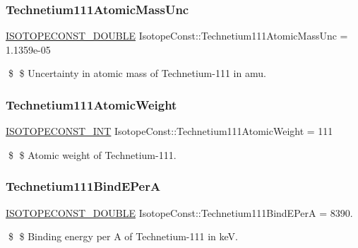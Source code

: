 \subsubsection{\texorpdfstring{Technetium111\+Atomic\+Mass\+Unc}{Technetium111AtomicMassUnc}}
{\footnotesize\ttfamily \mbox{\hyperlink{group___isotope_const-_macros_ga8f45a7272ce02c0b4c65c44636ed719a}{I\+S\+O\+T\+O\+P\+E\+C\+O\+N\+S\+T\+\_\+\+D\+O\+U\+B\+LE}} Isotope\+Const\+::\+Technetium111\+Atomic\+Mass\+Unc = 1.\+1359e-\/05}

\$ \$ Uncertainty in atomic mass of Technetium-\/111 in amu. \mbox{\label{group___isotope_const-_technetium-_tc111_gadb44932c0d6378e364ed1a945be941c7}} 
\subsubsection{\texorpdfstring{Technetium111\+Atomic\+Weight}{Technetium111AtomicWeight}}
{\footnotesize\ttfamily \mbox{\hyperlink{group___isotope_const-_macros_ga5f18360b3e99483a35c32d789e62621c}{I\+S\+O\+T\+O\+P\+E\+C\+O\+N\+S\+T\+\_\+\+I\+NT}} Isotope\+Const\+::\+Technetium111\+Atomic\+Weight = 111}

\$ \$ Atomic weight of Technetium-\/111. \mbox{\label{group___isotope_const-_technetium-_tc111_ga9b9850327df562053d065672c5c4f3b2}} 
\subsubsection{\texorpdfstring{Technetium111\+Bind\+E\+PerA}{Technetium111BindEPerA}}
{\footnotesize\ttfamily \mbox{\hyperlink{group___isotope_const-_macros_ga8f45a7272ce02c0b4c65c44636ed719a}{I\+S\+O\+T\+O\+P\+E\+C\+O\+N\+S\+T\+\_\+\+D\+O\+U\+B\+LE}} Isotope\+Const\+::\+Technetium111\+Bind\+E\+PerA = 8390.}

\$ \$ Binding energy per A of Technetium-\/111 in keV. \mbox{\label{group___isotope_const-_technetium-_tc111_ga82ca0db855f1d230e7d596865fe5a1f1}} 
